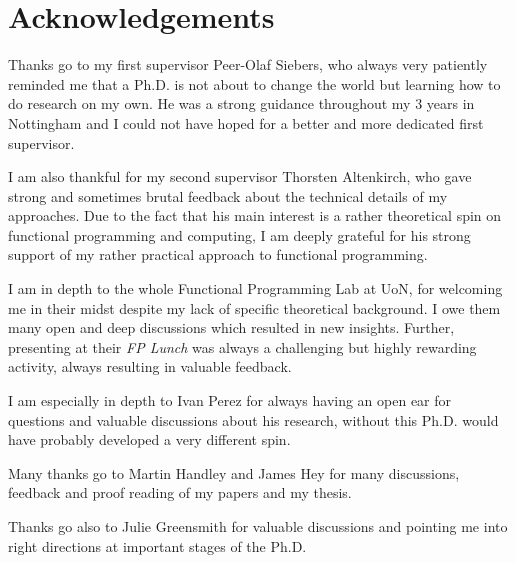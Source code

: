 \chapter*{Acknowledgements}
Thanks go to my first supervisor Peer-Olaf Siebers, who always very patiently reminded me that a Ph.D. is not about to change the world but learning how to do research on my own. He was a strong guidance throughout my 3 years in Nottingham and I could not have hoped for a better and more dedicated first supervisor.

I am also thankful for my second supervisor Thorsten Altenkirch, who gave strong and sometimes brutal feedback about the technical details of my approaches. Due to the fact that his main interest is a rather theoretical spin on functional programming and computing, I am deeply grateful for his strong support of my rather practical approach to functional programming.

I am in depth to the whole Functional Programming Lab at UoN, for welcoming me in their midst despite my lack of specific theoretical background. I owe them many open and deep discussions which resulted in new insights. Further, presenting at their \textit{FP Lunch} was always a challenging but highly rewarding activity, always resulting in valuable feedback.

I am especially in depth to Ivan Perez for always having an open ear for questions and valuable discussions about his research, without this Ph.D. would have probably developed a very different spin.

Many thanks go to Martin Handley and James Hey for many discussions, feedback and proof reading of my papers and my thesis.

Thanks go also to Julie Greensmith for valuable discussions and pointing me into right directions at important stages of the Ph.D.